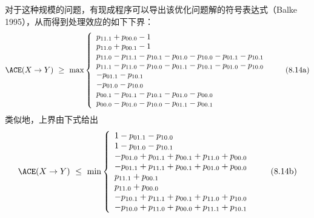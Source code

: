 对于这种规模的问题，有现成程序可以导出该优化问题解的符号表达式（Balke 1995），从而得到处理效应的如下下界：
\begin{equation}
\ACE(X\to Y)\ \ge\ \max\left\{
\begin{array}{l}
p_{11.1}+p_{00.0}-1\\
p_{11.0}+p_{00.1}-1\\
p_{11.0}-p_{11.1}-p_{10.1}-p_{01.0}-p_{10.0}-p_{01.1}-p_{10.1}\\
p_{11.1}-p_{11.0}-p_{10.0}-p_{01.1}-p_{10.1}-p_{01.0}-p_{10.0}\\
-p_{01.1}-p_{10.1}\\
-p_{01.0}-p_{10.0}\\
p_{00.1}-p_{01.1}-p_{10.1}-p_{01.0}-p_{00.0}\\
p_{00.0}-p_{01.0}-p_{10.0}-p_{01.1}-p_{00.1}
\end{array}\right. \tag{8.14a}
\end{equation}
类似地，上界由下式给出
\begin{equation}
\ACE(X\to Y)\ \le\ \min\left\{
\begin{array}{l}
1-p_{01.1}-p_{10.0}\\
1-p_{01.0}-p_{10.1}\\
-p_{01.0}+p_{01.1}+p_{00.1}+p_{11.0}+p_{00.0}\\
-p_{01.1}+p_{11.1}+p_{00.1}+p_{01.0}+p_{00.0}\\
p_{11.1}+p_{00.1}\\
p_{11.0}+p_{00.0}\\
-p_{10.1}+p_{11.1}+p_{00.1}+p_{11.0}+p_{10.0}\\
-p_{10.0}+p_{11.0}+p_{00.0}+p_{11.1}+p_{10.1}
\end{array}\right. \tag{8.14b}
\end{equation}

